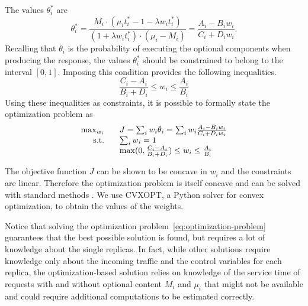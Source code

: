 The values $\theta_i^*$ are
\begin{equation}
  \theta_i^* = \frac{M_i \cdot \left( \mu_i t_i^* - 1 -\lambda w_i
      t_i^* \right)}{{\left( 1+\lambda w_i t_i^* \right) \cdot
      \left(\mu_i-M_i \right)}} = \frac{A_i - B_i w_i}{C_i + D_i w_i}.
  \label{eq:optimal-thetas}
\end{equation}
Recalling that $\theta_i$ is the probability of executing the optional
components when producing the response, the values $\theta_i^*$ should
be constrained to belong to the interval $[0, 1]$. Imposing this
condition provides the following inequalities.
\begin{equation}
  \frac{C_i-A_i}{B_i+D_i} \leq w_i \leq \frac{A_i}{B_i}
  \label{eq:constraints-optimal-thetas}
\end{equation}
Using these inequalities as constraints, it is possible to formally
state the optimization problem as
\begin{equation}
\begin{array}{rl}
  \max_{w_i} \;\;\; & J = \sum_i w_i \theta_i = \sum_i w_i  \frac{A_i - B_i w_i}{C_i + D_i w_i} \\
  \textnormal{s.t.} \;\;\; & \sum_i w_i = 1 \\
  & \max (0,\frac{C_i-A_i}{B_i+D_i}) \leq w_i \leq \frac{A_i}{B_i}
\end{array}
  \label{eq:optimization-problem}
\end{equation}

The objective function $J$ can be shown to be concave in $w_i$ and the
constraints are linear. Therefore the optimization problem is itself
concave and can be solved with standard methods . We use CVXOPT, a Python solver for convex optimization, to
obtain the values of the weights.

Notice that solving the optimization
problem~\eqref{eq:optimization-problem} guarantees that the best
possible solution is found, but requires a lot of knowledge about the
single replicas. In fact, while other solutions require knowledge only
about the incoming traffic and the control variables for each replica,
the optimization-based solution relies on knowledge of the service
time of requests with and without optional content $M_i$ and $\mu_i$
that might not be available and could require additional computations
to be estimated correctly.

